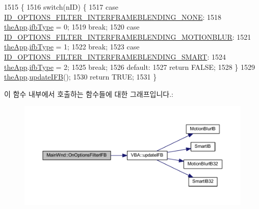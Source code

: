 \begin{DoxyCode}
1515 \{
1516   \textcolor{keywordflow}{switch}(nID) \{
1517   \textcolor{keywordflow}{case} \mbox{\hyperlink{resource_8h_afdae3676d339d2347ec856d6d41f757d}{ID\_OPTIONS\_FILTER\_INTERFRAMEBLENDING\_NONE}}:
1518     \mbox{\hyperlink{_v_b_a_8cpp_a8095a9d06b37a7efe3723f3218ad8fb3}{theApp}}.\mbox{\hyperlink{class_v_b_a_a4349741c5cec8852f8914093484418e8}{ifbType}} = 0;
1519     \textcolor{keywordflow}{break};
1520   \textcolor{keywordflow}{case} \mbox{\hyperlink{resource_8h_a3bcde991b46036373d2561e792097b35}{ID\_OPTIONS\_FILTER\_INTERFRAMEBLENDING\_MOTIONBLUR}}:
1521     \mbox{\hyperlink{_v_b_a_8cpp_a8095a9d06b37a7efe3723f3218ad8fb3}{theApp}}.\mbox{\hyperlink{class_v_b_a_a4349741c5cec8852f8914093484418e8}{ifbType}} = 1;
1522     \textcolor{keywordflow}{break};
1523   \textcolor{keywordflow}{case} \mbox{\hyperlink{resource_8h_a05cd7bc99a1031e7b74a561af9f8703c}{ID\_OPTIONS\_FILTER\_INTERFRAMEBLENDING\_SMART}}:
1524     \mbox{\hyperlink{_v_b_a_8cpp_a8095a9d06b37a7efe3723f3218ad8fb3}{theApp}}.\mbox{\hyperlink{class_v_b_a_a4349741c5cec8852f8914093484418e8}{ifbType}} = 2;
1525     \textcolor{keywordflow}{break};
1526   \textcolor{keywordflow}{default}:
1527     \textcolor{keywordflow}{return} FALSE;
1528   \}
1529   \mbox{\hyperlink{_v_b_a_8cpp_a8095a9d06b37a7efe3723f3218ad8fb3}{theApp}}.\mbox{\hyperlink{class_v_b_a_ab1caa25635cd40fc3b49b5d325cc65ef}{updateIFB}}();
1530   \textcolor{keywordflow}{return} TRUE;
1531 \}
\end{DoxyCode}
이 함수 내부에서 호출하는 함수들에 대한 그래프입니다.\+:
\nopagebreak
\begin{figure}[H]
\begin{center}
\leavevmode
\includegraphics[width=350pt]{class_main_wnd_ac08824702182bf311a093c5aa39936ef_cgraph}
\end{center}
\end{figure}
\mbox{\label{class_main_wnd_a753174cb5893b2a20c004f9431d1f7aa}} 
